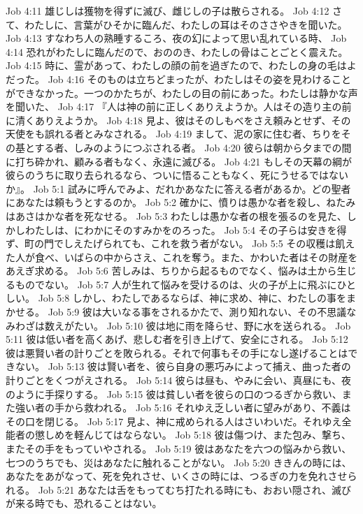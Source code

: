Job 4:11  雄じしは獲物を得ずに滅び、雌じしの子は散らされる。
Job 4:12  さて、わたしに、言葉がひそかに臨んだ、わたしの耳はそのささやきを聞いた。
Job 4:13  すなわち人の熟睡するころ、夜の幻によって思い乱れている時、
Job 4:14  恐れがわたしに臨んだので、おののき、わたしの骨はことごとく震えた。
Job 4:15  時に、霊があって、わたしの顔の前を過ぎたので、わたしの身の毛はよだった。
Job 4:16  そのものは立ちどまったが、わたしはその姿を見わけることができなかった。一つのかたちが、わたしの目の前にあった。わたしは静かな声を聞いた、
Job 4:17  『人は神の前に正しくありえようか。人はその造り主の前に清くありえようか。
Job 4:18  見よ、彼はそのしもべをさえ頼みとせず、その天使をも誤れる者とみなされる。
Job 4:19  まして、泥の家に住む者、ちりをその基とする者、しみのようにつぶされる者。
Job 4:20  彼らは朝から夕までの間に打ち砕かれ、顧みる者もなく、永遠に滅びる。
Job 4:21  もしその天幕の綱が彼らのうちに取り去られるなら、ついに悟ることもなく、死にうせるではないか』。
Job 5:1  試みに呼んでみよ、だれかあなたに答える者があるか。どの聖者にあなたは頼もうとするのか。
Job 5:2  確かに、憤りは愚かな者を殺し、ねたみはあさはかな者を死なせる。
Job 5:3  わたしは愚かな者の根を張るのを見た、しかしわたしは、にわかにそのすみかをのろった。
Job 5:4  その子らは安きを得ず、町の門でしえたげられても、これを救う者がない。
Job 5:5  その収穫は飢えた人が食べ、いばらの中からさえ、これを奪う。また、かわいた者はその財産をあえぎ求める。
Job 5:6  苦しみは、ちりから起るものでなく、悩みは土から生じるものでない。
Job 5:7  人が生れて悩みを受けるのは、火の子が上に飛ぶにひとしい。
Job 5:8  しかし、わたしであるならば、神に求め、神に、わたしの事をまかせる。
Job 5:9  彼は大いなる事をされるかたで、測り知れない、その不思議なみわざは数えがたい。
Job 5:10  彼は地に雨を降らせ、野に水を送られる。
Job 5:11  彼は低い者を高くあげ、悲しむ者を引き上げて、安全にされる。
Job 5:12  彼は悪賢い者の計りごとを敗られる。それで何事もその手になし遂げることはできない。
Job 5:13  彼は賢い者を、彼ら自身の悪巧みによって捕え、曲った者の計りごとをくつがえされる。
Job 5:14  彼らは昼も、やみに会い、真昼にも、夜のように手探りする。
Job 5:15  彼は貧しい者を彼らの口のつるぎから救い、また強い者の手から救われる。
Job 5:16  それゆえ乏しい者に望みがあり、不義はその口を閉じる。
Job 5:17  見よ、神に戒められる人はさいわいだ。それゆえ全能者の懲しめを軽んじてはならない。
Job 5:18  彼は傷つけ、また包み、撃ち、またその手をもっていやされる。
Job 5:19  彼はあなたを六つの悩みから救い、七つのうちでも、災はあなたに触れることがない。
Job 5:20  ききんの時には、あなたをあがなって、死を免れさせ、いくさの時には、つるぎの力を免れさせられる。
Job 5:21  あなたは舌をもってむち打たれる時にも、おおい隠され、滅びが来る時でも、恐れることはない。
